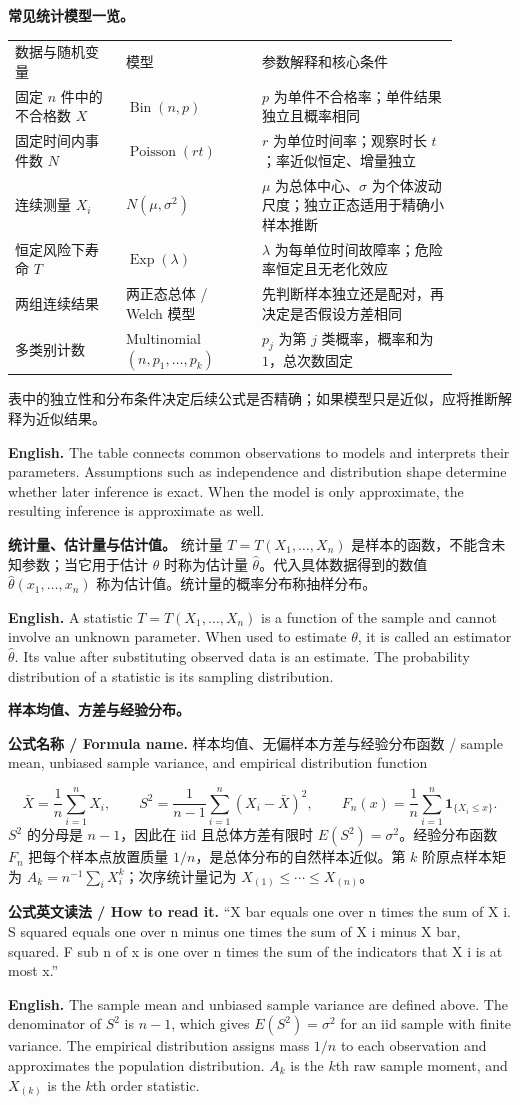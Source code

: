 \documentclass[UTF8,11pt,a4paper]{ctexart}
\newcommand{\EN}[1]{\par\noindent\textbf{English.} #1\par}
\newcommand{\READ}[1]{\par\noindent\textbf{公式英文读法 / How to read it.} #1\par}
\newcommand{\FORMULA}[2]{\par\noindent\textbf{公式名称 / Formula name.} #1 / #2\par}
\begin{document}
\noindent\textbf{常见统计模型一览。}
\begin{center}
\begin{tabular}{p{0.22\linewidth}p{0.27\linewidth}p{0.39\linewidth}}
数据与随机变量 & 模型 & 参数解释和核心条件\\
固定 $n$ 件中的不合格数 $X$ & $\operatorname{Bin}(n,p)$ & $p$ 为单件不合格率；单件结果独立且概率相同\\
固定时间内事件数 $N$ & $\operatorname{Poisson}(rt)$ & $r$ 为单位时间率；观察时长 $t$；率近似恒定、增量独立\\
连续测量 $X_i$ & $N(\mu,\sigma^2)$ & $\mu$ 为总体中心、$\sigma$ 为个体波动尺度；独立正态适用于精确小样本推断\\
恒定风险下寿命 $T$ & $\operatorname{Exp}(\lambda)$ & $\lambda$ 为每单位时间故障率；危险率恒定且无老化效应\\
两组连续结果 & 两正态总体 / Welch 模型 & 先判断样本独立还是配对，再决定是否假设方差相同\\
多类别计数 & Multinomial$(n,p_1,\ldots,p_k)$ & $p_j$ 为第 $j$ 类概率，概率和为 $1$，总次数固定
\end{tabular}
\end{center}
表中的独立性和分布条件决定后续公式是否精确；如果模型只是近似，应将推断解释为近似结果。
\EN{The table connects common observations to models and interprets their parameters. Assumptions such as independence and distribution shape determine whether later inference is exact. When the model is only approximate, the resulting inference is approximate as well.}

\noindent\textbf{统计量、估计量与估计值。} 统计量 $T=T(X_1,\ldots,X_n)$ 是样本的函数，不能含未知参数；当它用于估计 $\theta$ 时称为估计量 $\hat\theta$。代入具体数据得到的数值 $\hat\theta(x_1,\ldots,x_n)$ 称为估计值。统计量的概率分布称抽样分布。
\EN{A statistic $T=T(X_1,\ldots,X_n)$ is a function of the sample and cannot involve an unknown parameter. When used to estimate $\theta$, it is called an estimator $\hat\theta$. Its value after substituting observed data is an estimate. The probability distribution of a statistic is its sampling distribution.}

\noindent\textbf{样本均值、方差与经验分布。}
\FORMULA{样本均值、无偏样本方差与经验分布函数}{sample mean, unbiased sample variance, and empirical distribution function}
\[
\bar X=\frac1n\sum_{i=1}^nX_i,\qquad
S^2=\frac1{n-1}\sum_{i=1}^n(X_i-\bar X)^2,\qquad
F_n(x)=\frac1n\sum_{i=1}^n\mathbf 1_{\{X_i\le x\}}.
\]
$S^2$ 的分母是 $n-1$，因此在 iid 且总体方差有限时 $E(S^2)=\sigma^2$。经验分布函数 $F_n$ 把每个样本点放置质量 $1/n$，是总体分布的自然样本近似。第 $k$ 阶原点样本矩为 $A_k=n^{-1}\sum_iX_i^k$；次序统计量记为 $X_{(1)}\le\cdots\le X_{(n)}$。
\READ{“X bar equals one over n times the sum of X i. S squared equals one over n minus one times the sum of X i minus X bar, squared. F sub n of x is one over n times the sum of the indicators that X i is at most x.”}
\EN{The sample mean and unbiased sample variance are defined above. The denominator of $S^2$ is $n-1$, which gives $E(S^2)=\sigma^2$ for an iid sample with finite variance. The empirical distribution assigns mass $1/n$ to each observation and approximates the population distribution. $A_k$ is the $k$th raw sample moment, and $X_{(k)}$ is the $k$th order statistic.}
\end{document}
